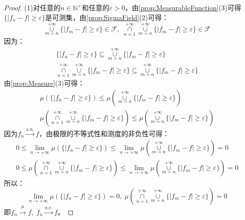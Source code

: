 \begin{proof}
	(1)对任意的$n\in\mathbb{N}^+$和任意的$\varepsilon>0$，由\cref{prop:MeasurableFunction}(3)可得$\{|f_n-f|\geqslant\varepsilon\}$是可测集，由\cref{prop:SigmaField}(2)可得：
	\begin{equation*}
		\underset{m=n}{\overset{+\infty}{\cup}}\{|f_m-f|\geqslant\varepsilon\}\in \mathscr{F},\;\underset{n=1}{\overset{+\infty}{\cap}}\underset{m=n}{\overset{+\infty}{\cup}}\{|f_m-f|\geqslant\varepsilon\}\in \mathscr{F}
	\end{equation*}
	因为：
	\begin{gather*}
		\{|f_n-f|\geqslant\varepsilon\}\subseteq\underset{m=n}{\overset{+\infty}{\cup}}\{|f_m-f|\geqslant\varepsilon\} \\
		\underset{n=1}{\overset{+\infty}{\cap}}\underset{m=n}{\overset{+\infty}{\cup}}\{|f_m-f|\geqslant\varepsilon\}\subseteq\underset{m=n}{\overset{+\infty}{\cup}}\{|f_m-f|\geqslant\varepsilon\}
	\end{gather*}
	由\cref{prop:Measure}(3)可得：
	\begin{gather*}
		\mu(\{|f_n-f|\geqslant\varepsilon\})\leqslant\mu\left(\underset{m=n}{\overset{+\infty}{\cup}}\{|f_m-f|\geqslant\varepsilon\}\right) \\
		\mu\left(\underset{n=1}{\overset{+\infty}{\cap}}\underset{m=n}{\overset{+\infty}{\cup}}\{|f_m-f|\geqslant\varepsilon\}\right)\leqslant\mu\left(\underset{m=n}{\overset{+\infty}{\cup}}\{|f_m-f|\geqslant\varepsilon\}\right) 
	\end{gather*}
	因为$f_n\overset{\text{a.u.}}{\longrightarrow}f$，由极限的不等式性和测度的非负性可得：
	\begin{gather*}
		0\leqslant\lim_{n\to+\infty}\mu(\{|f_n-f|\geqslant\varepsilon\})\leqslant\lim_{n\to+\infty}\mu\left(\underset{m=n}{\overset{+\infty}{\cup}}\{|f_m-f|\geqslant\varepsilon\}\right)=0 \\
		0\leqslant\mu\left(\underset{n=1}{\overset{+\infty}{\cap}}\underset{m=n}{\overset{+\infty}{\cup}}\{|f_m-f|\geqslant\varepsilon\}\right)\leqslant\lim_{n\to+\infty}\mu\left(\underset{m=n}{\overset{+\infty}{\cup}}\{|f_m-f|\geqslant\varepsilon\}\right)=0
	\end{gather*}
	所以：
	\begin{equation*}
		\lim_{n\to+\infty}\mu(\{|f_n-f|\geqslant\varepsilon\})=0,\;\mu\left(\underset{n=1}{\overset{+\infty}{\cap}}\underset{m=n}{\overset{+\infty}{\cup}}\{|f_m-f|\geqslant\varepsilon\}\right)=0
	\end{equation*}
	即$f_n\overset{\mu}{\longrightarrow}f,\;f_n\overset{a.e.}{\longrightarrow}f$。\par

\end{proof}
